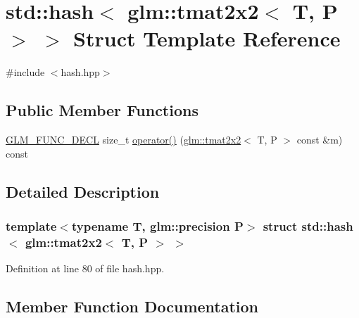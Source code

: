 \hypertarget{structstd_1_1hash_3_01glm_1_1tmat2x2_3_01_t_00_01_p_01_4_01_4}{}\section{std\+::hash$<$ glm\+::tmat2x2$<$ T, P $>$ $>$ Struct Template Reference}
\label{structstd_1_1hash_3_01glm_1_1tmat2x2_3_01_t_00_01_p_01_4_01_4}


{\ttfamily \#include $<$hash.\+hpp$>$}

\subsection*{Public Member Functions}
\begin{DoxyCompactItemize}
\item 
\mbox{\hyperlink{setup_8hpp_ab2d052de21a70539923e9bcbf6e83a51}{G\+L\+M\+\_\+\+F\+U\+N\+C\+\_\+\+D\+E\+CL}} size\+\_\+t \mbox{\hyperlink{structstd_1_1hash_3_01glm_1_1tmat2x2_3_01_t_00_01_p_01_4_01_4_a11195c425e2a14d50317c433c0a68562}{operator()}} (\mbox{\hyperlink{structglm_1_1tmat2x2}{glm\+::tmat2x2}}$<$ T, P $>$ const \&m) const
\end{DoxyCompactItemize}


\subsection{Detailed Description}
\subsubsection*{template$<$typename T, glm\+::precision P$>$\newline
struct std\+::hash$<$ glm\+::tmat2x2$<$ T, P $>$ $>$}



Definition at line 80 of file hash.\+hpp.



\subsection{Member Function Documentation}
\mbox{\label{structstd_1_1hash_3_01glm_1_1tmat2x2_3_01_t_00_01_p_01_4_01_4_a11195c425e2a14d50317c433c0a68562}} 
